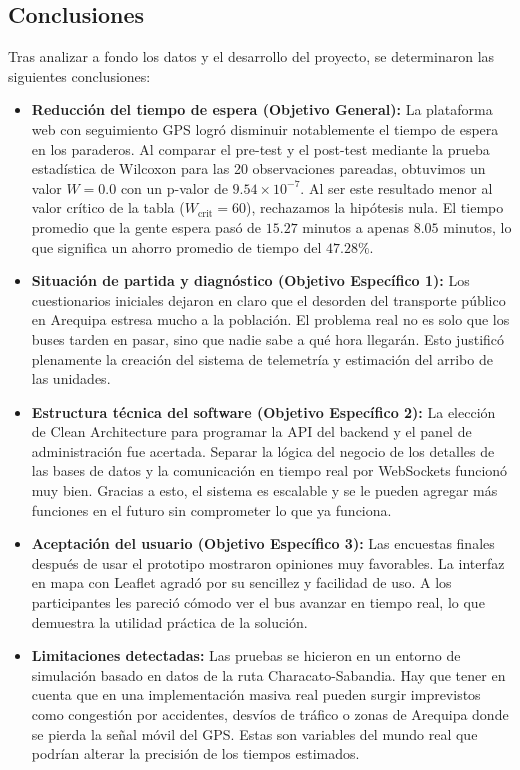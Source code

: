 \subsection*{Conclusiones}

Tras analizar a fondo los datos y el desarrollo del proyecto, se determinaron las siguientes conclusiones:

\begin{itemize}
    \item \textbf{Reducción del tiempo de espera (Objetivo General):} La plataforma web con seguimiento GPS logró disminuir notablemente el tiempo de espera en los paraderos. Al comparar el pre-test y el post-test mediante la prueba estadística de Wilcoxon para las 20 observaciones pareadas, obtuvimos un valor $W = 0.0$ con un p-valor de $9.54 \times 10^{-7}$. Al ser este resultado menor al valor crítico de la tabla ($W_{\text{crit}} = 60$), rechazamos la hipótesis nula. El tiempo promedio que la gente espera pasó de $15.27$ minutos a apenas $8.05$ minutos, lo que significa un ahorro promedio de tiempo del $47.28\%$.
    
    \item \textbf{Situación de partida y diagnóstico (Objetivo Específico 1):} Los cuestionarios iniciales dejaron en claro que el desorden del transporte público en Arequipa estresa mucho a la población. El problema real no es solo que los buses tarden en pasar, sino que nadie sabe a qué hora llegarán. Esto justificó plenamente la creación del sistema de telemetría y estimación del arribo de las unidades.
    
    \item \textbf{Estructura técnica del software (Objetivo Específico 2):} La elección de Clean Architecture para programar la API del backend y el panel de administración fue acertada. Separar la lógica del negocio de los detalles de las bases de datos y la comunicación en tiempo real por WebSockets funcionó muy bien. Gracias a esto, el sistema es escalable y se le pueden agregar más funciones en el futuro sin comprometer lo que ya funciona.
    
    \item \textbf{Aceptación del usuario (Objetivo Específico 3):} Las encuestas finales después de usar el prototipo mostraron opiniones muy favorables. La interfaz en mapa con Leaflet agradó por su sencillez y facilidad de uso. A los participantes les pareció cómodo ver el bus avanzar en tiempo real, lo que demuestra la utilidad práctica de la solución.
    
    \item \textbf{Limitaciones detectadas:} Las pruebas se hicieron en un entorno de simulación basado en datos de la ruta Characato-Sabandia. Hay que tener en cuenta que en una implementación masiva real pueden surgir imprevistos como congestión por accidentes, desvíos de tráfico o zonas de Arequipa donde se pierda la señal móvil del GPS. Estas son variables del mundo real que podrían alterar la precisión de los tiempos estimados.
\end{itemize}


